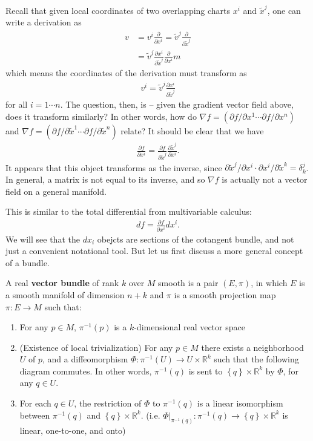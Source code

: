 \documentclass{../mathnotes}
\begin{document}
Recall that given local coordinates of two overlapping charts $x^i$ and $\tilde{x}^j$, one can write a derivation as
\begin{align*}
    v&=v^i\frac{\partial}{\partial x^i}=\tilde{v}^j\frac{\partial}{\partial \tilde{x}^j}\\
    &=\tilde{v}^j\frac{\partial x^i}{\partial \tilde{x}^j}\frac{\partial}{\partial x^i}m
\end{align*}
which means the coordinates of the derivation must transform as
\begin{align*}
    v^i=\tilde{v}^j\frac{\partial x^i}{\partial \tilde{x}^j}
\end{align*}
for all $i=1\cdots n$. The question, then, is -- given the gradient vector field above, does it transform similarly?
In other words, how do $\nabla f = \left( \partial f/\partial x^1 \cdots \partial f/\partial x^n \right)
$ and $\nabla f = \left( \partial f/\partial \tilde{x}^1 \cdots \partial f/\partial \tilde{x}^n \right)$ relate?
It should be clear that we have
\begin{align*}
    \frac{\partial f}{\partial x^i}=\frac{\partial f}{\partial \tilde{x}^j}\frac{\partial\tilde{x}^j}{\partial x^i}.
\end{align*}
It appears that this object transforms as the inverse, since
$\partial \tilde{x}^j/\partial x^i\cdot\partial x^i/\partial\tilde{x}^k=\delta^j_k$.
In general, a matrix is not equal to its inverse, and so $\nabla f$ is actually not a vector field on a general manifold.

This is similar to the total differential from multivariable calculus:
\begin{align*}
    df=\frac{\partial f}{\partial x^i}dx^i.
\end{align*}
We will see that the $dx_i$ obejcts are sections of the cotangent bundle, and not just a convenient notational tool.
But let us first discuss a more general concept of a bundle.

\begin{defn}
    A real \textbf{vector bundle} of rank $k$ over $M$ smooth is a pair $(E,\pi)$, in which $E$ is a smooth manifold of dimension
    $n+k$ and $\pi$ is a smooth projection map $\pi:E\to M$ such that:
    \begin{enumerate}
        \item For any $p\in M$, $\pi^{-1}(p)$ is a $k$-dimensional real vector space
        \item (Existence of local trivialization) For any $p\in M$ there exists a neighborhood $U$ of $p$, and
            a diffeomorphism $\Phi:\pi^{-1}(U)\to U\times \mathbb{R}^k$ such that the following diagram commutes.
            In other words, $\pi^{-1}(q)$ is sent to $\left\{ q \right\}\times \mathbb{R}^k$ by $\Phi$, for any $q\in U$.
        \item For each $q\in U$, the restriction of $\Phi$ to $\pi^{-1}(q)$ is a linear isomorphism between $\pi^{-1}(q)$
            and $\left\{ q \right\}\times \mathbb{R}^k$. (i.e. $\Phi|_{\pi^{-1}(q)}:\pi^{-1}(q)\to\left\{ q \right\}\times \mathbb{R}^k$
            is linear, one-to-one, and onto)
    \end{enumerate}
\end{defn}
\end{document}

